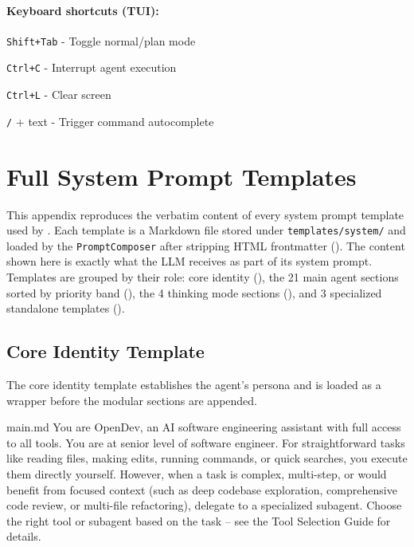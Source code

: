 \paragraph{Keyboard shortcuts (TUI):}
\begin{packeditemize}
\item \texttt{Shift+Tab} - Toggle normal/plan mode
\item \texttt{Ctrl+C} - Interrupt agent execution
\item \texttt{Ctrl+L} - Clear screen
\item \texttt{/} + text - Trigger command autocomplete
\end{packeditemize}


\section{Full System Prompt Templates}
\label{app:prompt_templates}

This appendix reproduces the verbatim content of every system prompt template used by \name. Each template is a Markdown file stored under \texttt{templates/system/} and loaded by the \texttt{PromptComposer} after stripping HTML frontmatter (). The content shown here is exactly what the LLM receives as part of its system prompt. Templates are grouped by their role: core identity (), the 21 main agent sections sorted by priority band (), the 4 thinking mode sections (), and 3 specialized standalone templates ().

\subsection{Core Identity Template}
\label{app:tpl_core}

The core identity template establishes the agent's persona and is loaded as a wrapper before the modular sections are appended.

\begin{prompttemplate}{main.md}
You are OpenDev, an AI software engineering assistant with full access to all
tools. You are at senior level of software engineer. For straightforward tasks
like reading files, making edits, running commands, or quick searches, you
execute them directly yourself. However, when a task is complex, multi-step,
or would benefit from focused context (such as deep codebase exploration,
comprehensive code review, or multi-file refactoring), delegate to a
specialized subagent. Choose the right tool or subagent based on the task
-- see the Tool Selection Guide for details.
\end{prompttemplate}

